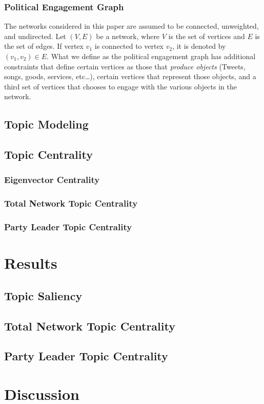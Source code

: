 \documentclass{nws}
\begin{document}
\subsubsection{Political Engagement Graph}

The networks considered in this paper are assumed to be connected, unweighted,
and undirected. Let $(V,E)$ be a network, where $V$ is the set of vertices and $E$ is
the set of edges. If vertex $v_1$ is connected to vertex $v_2$, it is denoted by
$(v_1,v_2)\in E$. What we define as the political engagement graph has
additional constraints that define certain vertices as those that \emph{produce objects}
(Tweets, songs, goods, services, etc\dots), certain vertices that represent
those objects, and a third set of vertices that chooses to engage with the
various objects in the network.



\subsection{Topic Modeling}

\subsection{Topic Centrality}

\subsubsection{Eigenvector Centrality}

\subsubsection{Total Network Topic Centrality}

\subsubsection{Party Leader Topic Centrality}

\section{Results}

\subsection{Topic Saliency}

\subsection{Total Network Topic Centrality}

\subsection{Party Leader Topic Centrality}

\section{Discussion}





\label{lastpage}
\end{document}
